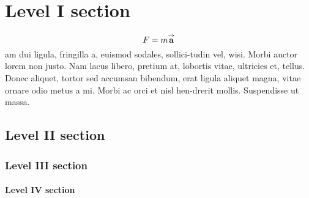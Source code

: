 \documentclass[12 pt]{article}
\begin{document}

\section{Level I section}
\lipsum[1]
\[
    F = m \Vector{a}
\]
am dui ligula, fringilla a, euismod sodales, sollici-tudin vel, wisi.
Morbi auctor lorem non justo.
Nam  lacus libero, pretium at, lobortis vitae, ultricies et, tellus.
Donec aliquet, tortor sed accumsan bibendum, erat ligula aliquet magna, vitae ornare odio metus a mi.
Morbi ac orci et nisl hen-drerit mollis.
Suspendisse ut massa.

\subsection{Level II section}
\lipsum[3]

\subsubsection{Level III section}
\lipsum[4]

\paragraph{Level IV section}
\lipsum[5]
\end{document}
